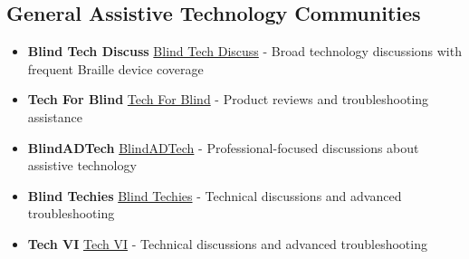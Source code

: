 \subsection{General Assistive Technology Communities}
\label{app2:at-communities}
\begin{itemize}
	\item \textbf{Blind Tech Discuss} \href{https://groups.io/g/blindtechdiscuss}{Blind Tech Discuss} - Broad technology discussions with frequent Braille device coverage
	\item \textbf{Tech For Blind} \href{https://groups.io/g/tech-for-blind}{Tech For Blind} - Product reviews and troubleshooting assistance
	\item \textbf{BlindADTech} \href{https://groups.io/g/blindadtech}{BlindADTech} - Professional-focused discussions about assistive technology
	\item \textbf{Blind Techies} \href{https://groups.io/g/blind-techies}{Blind Techies} - Technical discussions and advanced troubleshooting
	\item \textbf{Tech VI} \href{https://groups.io/g/tech-vi}{Tech VI} - Technical discussions and advanced troubleshooting
\end{itemize}

